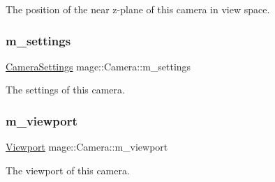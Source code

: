 The position of the near z-\/plane of this camera in view space. \hypertarget{classmage_1_1_camera_a922a7d227da929739167bf1c90a14d77}{}\label{classmage_1_1_camera_a922a7d227da929739167bf1c90a14d77} 
\subsubsection{\texorpdfstring{m\+\_\+settings}{m\_settings}}
{\footnotesize\ttfamily \hyperlink{classmage_1_1_camera_settings}{Camera\+Settings} mage\+::\+Camera\+::m\+\_\+settings\hspace{0.3cm}{\ttfamily [private]}}

The settings of this camera. \hypertarget{classmage_1_1_camera_aab06bebec3532a3b7afe735aaf316b7d}{}\label{classmage_1_1_camera_aab06bebec3532a3b7afe735aaf316b7d} 
\subsubsection{\texorpdfstring{m\+\_\+viewport}{m\_viewport}}
{\footnotesize\ttfamily \hyperlink{classmage_1_1_viewport}{Viewport} mage\+::\+Camera\+::m\+\_\+viewport\hspace{0.3cm}{\ttfamily [private]}}

The viewport of this camera. 